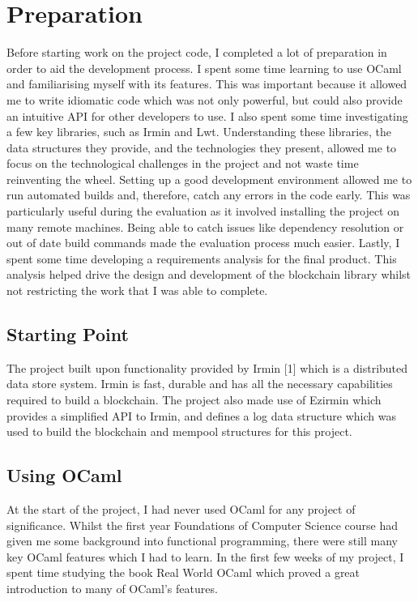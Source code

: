 \documentclass[12pt,a4paper,twoside,openright]{report}
\begin{document}
	\chapter{Preparation}
	Before starting work on the project code, I completed a lot of preparation in order to aid the development process.
	I spent some time learning to use OCaml and familiarising myself with its features.
	This was important because it allowed me to write idiomatic code which was not only powerful, but could also provide an intuitive API for other developers to use.
	I also spent some time investigating a few key libraries, such as Irmin and Lwt.
	Understanding these libraries, the data structures they provide, and the technologies they present, allowed me to focus on the technological challenges in the project and not waste time reinventing the wheel. 
	Setting up a good development environment allowed me to run automated builds and, therefore, catch any errors in the code early.
	This was particularly useful during the evaluation as it involved installing the project on many remote machines.
	Being able to catch issues like dependency resolution or out of date build commands made the evaluation process much easier.
	Lastly, I spent some time developing a requirements analysis for the final product. 
	This analysis helped drive the design and development of the blockchain library whilst not restricting the work that I was able to complete.

	\section{Starting Point}
	The project built upon functionality provided by Irmin [1] which is a distributed data store system. Irmin is fast, durable and has all the necessary capabilities required to build a blockchain.
	The project also made use of Ezirmin \cite{Ezirmin} which provides a simplified API to Irmin, and defines a log data structure which was used to build the blockchain and mempool structures for this project.

	\section{Using OCaml}
	At the start of the project, I had never used OCaml for any project of significance. 
	Whilst the first year Foundations of Computer Science course had given me some background into functional programming, there were still many key OCaml features which I had to learn.
	In the first few weeks of my project, I spent time studying the book Real World OCaml \cite{RealWorldOCaml} which proved a great introduction to many of OCaml's features.  
\end{document}
